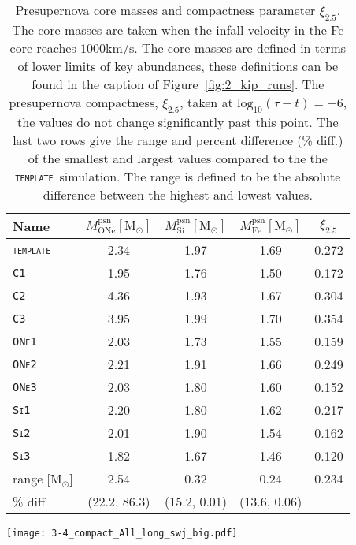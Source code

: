 \documentclass[useAMS,usenatbib]{mn2e}
\newcommand{\Msun}{\ensuremath{\mathrm{M}_\odot}}
\newcommand{\template}{\textsc{\texttt{template}}}
\newcommand{\Ca}{\textsc{\texttt{C1}}}
\newcommand{\Cb}{\textsc{\texttt{C2}}}
\newcommand{\Cc}{\textsc{\texttt{C3}}}
\newcommand{\ONea}{\textsc{\texttt{ONe1}}}
\newcommand{\ONeb}{\textsc{\texttt{ONe2}}}
\newcommand{\ONec}{\textsc{\texttt{ONe3}}}
\newcommand{\Sia}{\textsc{\texttt{Si1}}}
\newcommand{\Sib}{\textsc{\texttt{Si2}}}
\newcommand{\Sic}{\textsc{\texttt{Si3}}}
\begin{document}
\begin{table}
	\centering
	\caption{Presupernova core masses and compactness parameter
		$\xi_{2.5}$. The core masses are taken when the infall velocity
		in the Fe core reaches $1000 \mathrm{km/s}$. The core masses
		are defined in terms of lower limits of key abundances, these
		definitions can be found in the caption of
		Figure~\ref{fig:2_kip_runs}. The presupernova compactness,
		$\xi_{2.5}$, taken at $\mathrm{log}_{10}(\tau - t) = -6$, the 
		values do not change significantly past this point. The last two 
		rows give the range and percent difference (\% diff.) of the smallest and 
		largest values compared to the the \template~simulation. The 
		range is defined to be the absolute difference between the 
		highest and lowest values.
	}
	\begin{tabular}{lcccc}
		\toprule
		Name & 
		$M^{\mathrm{psn}}_{\mathrm{ONe}} [\Msun]$ &
		$M^{\mathrm{psn}}_{\mathrm{Si}} [\Msun]$  &
		$M^{\mathrm{psn}}_{\mathrm{Fe}} [\Msun]$  &
		$\xi_{2.5}$
		\tabularnewline
		\midrule
		\template & 2.34 & 1.97 & 1.69  &  0.272  \\ 
		\Ca       & 1.95 & 1.76 & 1.50  &  0.172  \\ 
		\Cb       & 4.36 & 1.93 & 1.67  &  0.304  \\ 
		\Cc       & 3.95 & 1.99 & 1.70  &  0.354  \\ 
		\ONea     & 2.03 & 1.73 & 1.55  &  0.159  \\ 
		\ONeb     & 2.21 & 1.91 & 1.66  &  0.249  \\ 
		\ONec     & 2.03 & 1.80 & 1.60  &  0.152  \\ 
		\Sia      & 2.20 & 1.80 & 1.62  &  0.217  \\ 
		\Sib      & 2.01 & 1.90 & 1.54  &  0.162  \\ 
		\Sic      & 1.82 & 1.67 & 1.46  &  0.120  \\ 
		\midrule
		range [\Msun]    & 2.54 & 0.32 & 0.24  &  0.234  \\
		\% diff & (22.2, 86.3) & (15.2, 0.01) & (13.6, 0.06) &  \\
		\bottomrule
	\end{tabular}
	\label{tab:preSN_pars}
\end{table}

\begin{figure*}
	\texttt{[image: 3-4\_compact\_All\_long\_swj\_big.pdf]}
	\caption{
		Evolution of the compactness parameter for the three sets of simulations. The x-axis
		in given in log of the time left until collapse. The colours of the
		line represents the core burning stage where grey is C core burning,
		orange is Ne and O core burning and blue is Si core burning. Each set
		of simulations diverges from the template soon after the enhanced CBM
		is implemented. Differences in the evolutionary compactness before this
		are due to differences in the age of the stars being simulated.
	}
	\label{fig:compact} %
\end{figure*}
\end{document}

